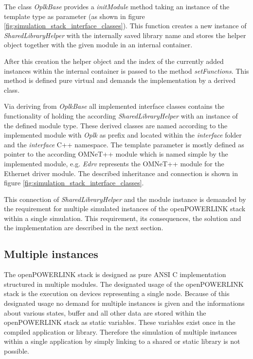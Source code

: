 The class \emph{OplkBase} provides a \emph{initModule} method taking an instance of the template type as parameter (as shown in figure \ref{fig:simulation_stack_interface_classes}).
This function creates a new instance of \emph{SharedLibraryHelper} with the internally saved library name and stores the helper object together with the given module in an internal container.

After this creation the helper object and the index of the currently added instances within the internal container is passed to the method \emph{setFunctions}.
This method is defined pure virtual and demands the implementation by a derived class.

Via deriving from \emph{OplkBase} all implemented interface classes contains the functionality of holding the according \emph{SharedLibraryHelper} with an instance of the defined module type.
These derived classes are named according to the implemented module with \emph{Oplk} as prefix and located within the \emph{interface} folder and the \emph{interface} C++ namespace.
The template parameter is mostly defined as pointer to the according OMNeT++ module which is named simple by the implemented module, e.g. \emph{Edrv} represents the OMNeT++ module for the Ethernet driver module.
The described inheritance and connection is shown in figure \ref{fig:simulation_stack_interface_classes}.

This connection of \emph{SharedLibraryHelper} and the module instance is demanded by the requirement for multiple simulated instances of the openPOWERLINK stack within a single simulation.
This requirement, its consequences, the solution and the implementation are described in the next section.

\subsection{Multiple instances}
\label{sec:porting_stack_multiinstance}
The openPOWERLINK stack is designed as pure ANSI C implementation structured in multiple modules.
The designated usage of the openPOWERLINK stack is the execution on devices representing a single node.
Because of this designated usage no demand for multiple instances is given and the informations about various states, buffer and all other data are stored within the openPOWERLINK stack as static variables.
These variables exist once in the compiled application or library.
Therefore the simulation of multiple instances within a single application by simply linking to a shared or static library is not possible.

